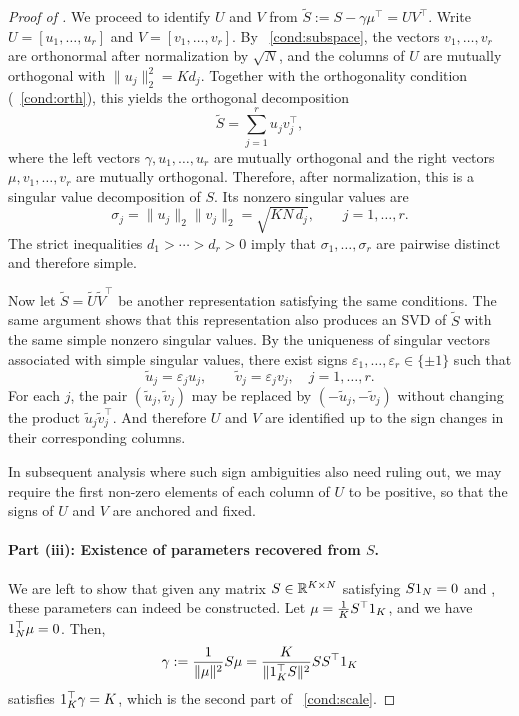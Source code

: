 \documentclass{article}
\begin{document}
\begin{bibunit}[unsrtnat]
\begin{proof}[Proof of ]
    We proceed to identify $U$ and $V$ from $\tilde{S}:=S-\gamma\mu^\top=UV^\top$. Write $U=[u_1,\dots,u_r]$ and $V=[v_1,\dots,v_r]$. By ~\ref{cond:subspace}, the vectors $v_1,\dots,v_r$ are orthonormal after normalization by $\sqrt{N}$, and the columns of $U$ are mutually orthogonal with $\|u_j\|_2^2=Kd_j$. Together with the orthogonality condition (~\ref{cond:orth}), this yields the orthogonal decomposition
    $$\tilde{S}=\sum_{j=1}^r u_jv_j^\top,$$
    where the left vectors $\gamma,u_1,\dots,u_r$ are mutually orthogonal and the right vectors $\mu,v_1,\dots,v_r$ are mutually orthogonal.
    Therefore, after normalization, this is a singular value decomposition of $S$. Its nonzero singular values are
    $$
    \sigma_j=\|u_j\|_2\|v_j\|_2=\sqrt{KN\,d_j}, \qquad j=1,\dots,r.
    $$
    The strict inequalities $d_1>\cdots>d_r>0$ imply that $\sigma_1,\dots,\sigma_r$ are pairwise distinct and therefore simple.

    Now let $\tilde{S}=\tilde{U}\tilde{V}^\top$ be another representation satisfying the same conditions. The same argument shows that this representation also produces an SVD of $\tilde{S}$ with the same simple nonzero singular values. By the uniqueness of singular vectors associated with simple singular values, there exist signs $\varepsilon_1,\dots,\varepsilon_r\in\{\pm1\}$ such that
    $$ 
        \tilde{u}_j=\varepsilon_j u_j,\qquad
        \tilde{v}_j=\varepsilon_j v_j,\quad j=1,\dots,r.
    $$
    For each $j$, the pair $(\tilde{u}_j,\tilde{v}_j)$ may be replaced by $(-\tilde{u}_j,-\tilde{v}_j)$ without changing the product $\tilde{u}_j\tilde{v}_j^\top$. And therefore $U$ and $V$ are identified up to the sign changes in their corresponding columns.
    
    \begin{remark} \label{rem:sign-id}
        In subsequent analysis where such sign ambiguities also need ruling out, we may require the first non-zero elements of each column of $U$ to be positive, so that the signs of $U$ and $V$ are anchored and fixed.
    \end{remark}
    
    \paragraph{Part (iii): Existence of parameters recovered from $S$.} 
    We are left to show that given any matrix $S\in\mathbb{R}^{K\times N}$ satisfying $S1_N=0$ and , these parameters can indeed be constructed. Let $\mu=\frac{1}{K}S^\top1_K$, and we have $1_N^\top\mu=0$.
    Then, $$\gamma:=\frac{1}{\|\mu\|^2}S\mu=\frac{K}{\|1_K^\top S\|^2}SS^\top1_K$$ satisfies $1_K^\top \gamma = K$, which is the second part of ~\ref{cond:scale}.


\end{proof}
\end{bibunit}
\end{document}

